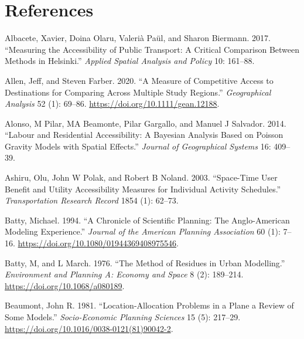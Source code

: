 \documentclass[
]{article}
\newlength{\cslhangindent}
\newenvironment{CSLReferences}[2] %
 {\begin{list}{}{%
  \setlength{\itemindent}{0pt}
  \setlength{\leftmargin}{0pt}
  \setlength{\parsep}{0pt}
  \ifodd #1
   \setlength{\leftmargin}{\cslhangindent}
   \setlength{\itemindent}{-1\cslhangindent}
  \fi
  \setlength{\itemsep}{#2\baselineskip}}}
 {\end{list}}
\begin{document}
\section*{References}\label{references}

\label{refs}
\begin{CSLReferences}{1}{0}
Albacete, Xavier, Doina Olaru, Valerià Paül, and Sharon Biermann. 2017.
{``Measuring the Accessibility of Public Transport: A Critical
Comparison Between Methods in Helsinki.''} \emph{Applied Spatial
Analysis and Policy} 10: 161--88.

Allen, Jeff, and Steven Farber. 2020. {``A Measure of Competitive Access
to Destinations for Comparing Across Multiple Study Regions.''}
\emph{Geographical Analysis} 52 (1): 69--86.
\url{https://doi.org/10.1111/gean.12188}.

Alonso, M Pilar, MA Beamonte, Pilar Gargallo, and Manuel J Salvador.
2014. {``Labour and Residential Accessibility: A Bayesian Analysis Based
on Poisson Gravity Models with Spatial Effects.''} \emph{Journal of
Geographical Systems} 16: 409--39.

Ashiru, Olu, John W Polak, and Robert B Noland. 2003. {``Space-Time User
Benefit and Utility Accessibility Measures for Individual Activity
Schedules.''} \emph{Transportation Research Record} 1854 (1): 62--73.

Batty, Michael. 1994. {``A {Chronicle} of {Scientific} {Planning}: {The}
{Anglo}-{American} {Modeling} {Experience}.''} \emph{Journal of the
American Planning Association} 60 (1): 7--16.
\url{https://doi.org/10.1080/01944369408975546}.

Batty, M, and L March. 1976. {``The Method of Residues in Urban
Modelling.''} \emph{Environment and Planning A: Economy and Space} 8
(2): 189--214. \url{https://doi.org/10.1068/a080189}.

Beaumont, John R. 1981. {``Location-Allocation Problems in a Plane a
Review of Some Models.''} \emph{Socio-Economic Planning Sciences} 15
(5): 217--29. \url{https://doi.org/10.1016/0038-0121(81)90042-2}.


\end{CSLReferences}
\end{document}

